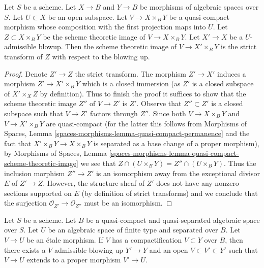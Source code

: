 \begin{lemma}
\label{lemma-replaced-by-strict-transform}
Let $S$ be a scheme. Let $X \to B$ and $Y \to B$ be morphisms of
algebraic spaces over $S$. Let $U \subset X$ be an open subspace.
Let $V \to X \times_B Y$ be a quasi-compact morphism
whose composition with the first projection maps into $U$.
Let $Z \subset X \times_B Y$ be the scheme theoretic image of
$V \to X \times_B Y$. Let $X' \to X$ be a $U$-admissible blowup.
Then the scheme theoretic image of $V \to X' \times_B Y$ is the
strict transform of $Z$ with respect to the blowing up.
\end{lemma}

\begin{proof}
Denote $Z' \to Z$ the strict transform. The morphism $Z' \to X'$
induces a morphism $Z' \to X' \times_B Y$ which is a closed immersion
(as $Z'$ is a closed subspace of $X' \times_X Z$ by definition).
Thus to finish the proof it suffices to show that the scheme theoretic
image $Z''$ of $V \to Z'$ is $Z'$. Observe that $Z'' \subset Z'$
is a closed subspace such that $V \to Z'$ factors through $Z''$.
Since both $V \to X \times_B Y$ and $V \to X' \times_B Y$ are
quasi-compact (for the latter this follows from Morphisms of Spaces, Lemma
\ref{spaces-morphisms-lemma-quasi-compact-permanence}
and the fact that $X' \times_B Y \to X \times_B Y$ is separated
as a base change of a proper morphism), by Morphisms of Spaces, Lemma
\ref{spaces-morphisms-lemma-quasi-compact-scheme-theoretic-image}
we see that $Z \cap (U \times_B Y) = Z'' \cap (U \times_B Y)$.
Thus the inclusion morphism $Z'' \to Z'$ is an isomorphism
away from the exceptional divisor $E$ of $Z' \to Z$. However, the
structure sheaf of $Z'$ does not have any nonzero sections supported
on $E$ (by definition of strict transforms) and we conclude that
the surjection $\mathcal{O}_{Z'} \to \mathcal{O}_{Z''}$ must be an isomorphism.
\end{proof}

\begin{lemma}
\label{lemma-compactification-dominates}
Let $S$ be a scheme. Let $B$ be a quasi-compact and quasi-separated
algebraic space over $S$. Let $U$ be an algebraic space
of finite type and separated over $B$. Let $V \to U$ be an \'etale morphism.
If $V$ has a compactification $V \subset Y$ over $B$, then there
exists a $V$-admissible blowing up $Y' \to Y$ and an
open $V \subset V' \subset Y'$ such that $V \to U$
extends to a proper morphism $V' \to U$.
\end{lemma}

